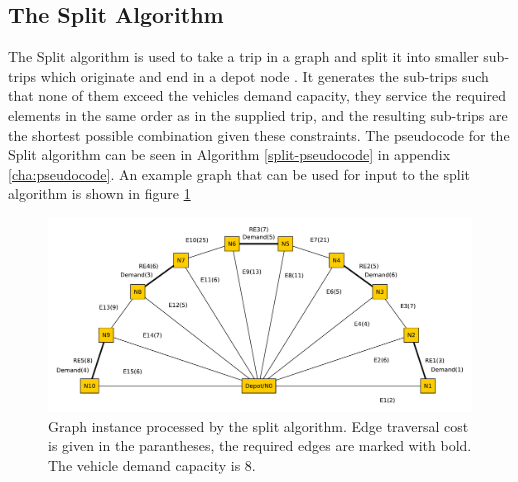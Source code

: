 
\subsection{The Split Algorithm} %
\label{sub:the_split_algorithm}

The Split algorithm is used to take a trip in a graph and split it into smaller sub-trips which originate and end in a depot node \citep{ulusoy1985CARP}. It generates the sub-trips such that none of them exceed the vehicles demand capacity, they service the required elements in the same order as in the supplied trip, and the resulting sub-trips are the shortest possible combination given these constraints. The pseudocode for the Split algorithm can be seen in Algorithm \ref{split-pseudocode} in appendix \ref{cha:pseudocode}. An example graph that can be used for input to the split algorithm is shown in figure \ref{fig:sgwspp}

\begin{figure}[thbp]
    \centerline{\includegraphics[width=\textwidth]{figures/SplitIllustrations/Split_GraphWithShortestPathsPlain.pdf}}
    \caption{Graph instance processed by the split algorithm. Edge traversal cost is given in the parantheses, the required edges are marked with bold. The vehicle demand capacity is 8.}
    \label{fig:sgwspp}
\end{figure}


